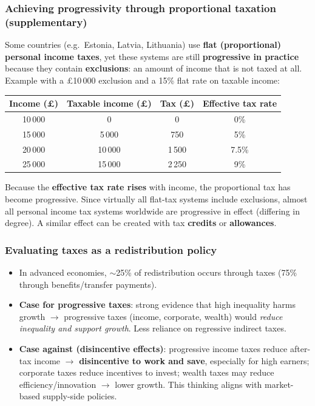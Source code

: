 \documentclass[a4paper,12pt]{article}
\newcommand{\needbold}[1]{\textcolor{red!70!black}{\textbf{#1}}}
\begin{document}
\subsubsection*{Achieving progressivity through proportional taxation (supplementary)}
Some countries (e.g.\ Estonia, Latvia, Lithuania) use \textbf{flat (proportional) personal income taxes}, yet these systems are still \textbf{progressive in practice} because they contain \needbold{exclusions}: an amount of income that is not taxed at all. Example with a \pounds10\,000 exclusion and a 15\% flat rate on taxable income:
\begin{center}
\begin{tabular}{cccc}
\toprule
\textbf{Income (\pounds)} & \textbf{Taxable income (\pounds)} & \textbf{Tax (\pounds)} & \textbf{Effective tax rate} \\
\midrule
10\,000 & 0 & 0 & 0\% \\
15\,000 & 5\,000 & 750 & 5\% \\
20\,000 & 10\,000 & 1\,500 & 7.5\% \\
25\,000 & 15\,000 & 2\,250 & 9\% \\
\bottomrule
\end{tabular}
\end{center}
Because the \textbf{effective tax rate rises} with income, the proportional tax has become progressive. Since virtually all flat-tax systems include exclusions, almost all personal income tax systems worldwide are progressive in effect (differing in degree). A similar effect can be created with tax \textbf{credits} or \textbf{allowances}.

\subsubsection*{Evaluating taxes as a redistribution policy}
\begin{itemize}
  \item In advanced economies, $\sim$25\% of redistribution occurs through taxes (75\% through benefits/transfer payments).
  \item \textbf{Case for progressive taxes}: strong evidence that high inequality harms growth $\to$ progressive taxes (income, corporate, wealth) would \textit{reduce inequality and support growth}. Less reliance on regressive indirect taxes.
  \item \textbf{Case against (disincentive effects)}: progressive income taxes reduce after-tax income $\to$ \textbf{disincentive to work and save}, especially for high earners; corporate taxes reduce incentives to invest; wealth taxes may reduce efficiency/innovation $\to$ lower growth. This thinking aligns with market-based supply-side policies.
\end{itemize}
\end{document}
